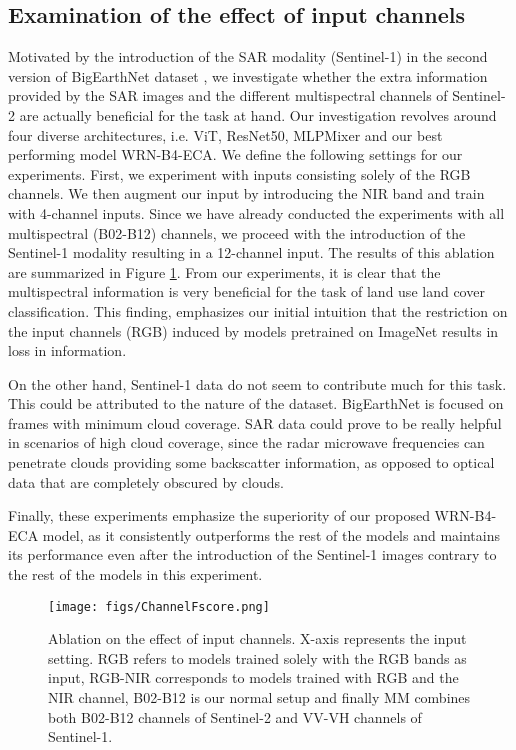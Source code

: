 \documentclass[journal]{IEEEtran}
\begin{document}
\subsection{Examination of the effect of input channels}
 Motivated by the introduction of the SAR modality (Sentinel-1) in the second version of BigEarthNet dataset \citep{sumbul2021bigearthnetmm}, we investigate whether the extra information provided by the SAR images and the different multispectral channels of Sentinel-2 are actually beneficial for the task at hand. Our investigation revolves around four diverse architectures, i.e. ViT, ResNet50, MLPMixer and our best performing model WRN-B4-ECA. We define the following settings for our experiments. First, we experiment with inputs consisting solely of the RGB channels. We then augment our input by introducing the NIR band and train with 4-channel inputs. Since we have already conducted the experiments with all multispectral (B02-B12) channels, we proceed with the introduction of the Sentinel-1 modality resulting in a 12-channel input. The results of this ablation are summarized in Figure \ref{fig:channel_ablation}. From our experiments, it is clear that the multispectral information is very beneficial for the task of land use land cover classification. This finding, emphasizes our initial intuition that the restriction on the input channels (RGB) induced by models pretrained on ImageNet results in loss in information.
 
 On the other hand, Sentinel-1 data do not seem to contribute much for this task. This could be attributed to the nature of the dataset. BigEarthNet is focused on frames with minimum cloud coverage. SAR data could prove to be really helpful in scenarios of high cloud coverage, since the radar microwave frequencies can penetrate clouds providing some backscatter information, as opposed to optical data that are completely obscured by clouds.  
 
 Finally, these experiments emphasize the superiority of our proposed WRN-B4-ECA model, as it consistently outperforms the rest of the models and maintains its performance even after the introduction of the Sentinel-1 images contrary to the rest of the models in this experiment.
 
 
 \begin{figure}[ht]
\centering
 \texttt{[image: figs/ChannelFscore.png]}
\caption{Ablation on the effect of input channels. X-axis represents the input setting. RGB refers to models trained solely with the RGB bands as input, RGB-NIR corresponds to models trained with RGB and the NIR channel, B02-B12 is our normal setup and finally MM combines both B02-B12 channels of Sentinel-2 and VV-VH channels of Sentinel-1.}
\label{fig:channel_ablation}
\end{figure}
 
\end{document}
